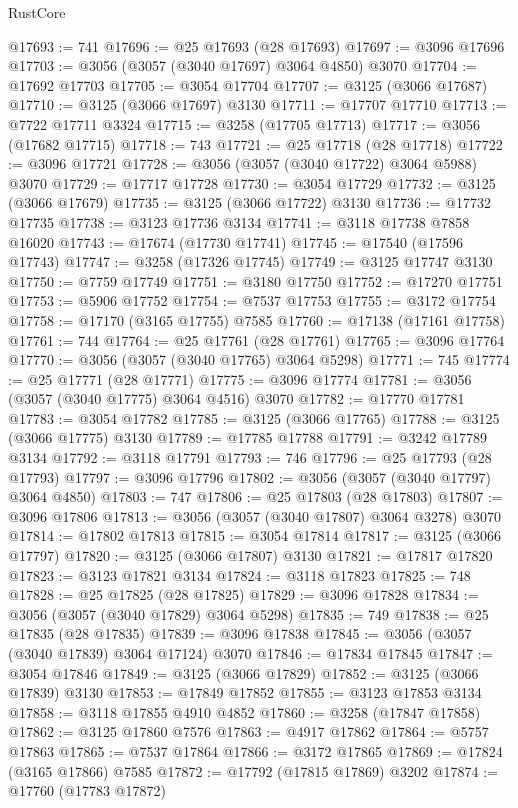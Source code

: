 \begin{lexlean}{RustCore}
\begin{coremodule}
@17693 := 741
@17696 := @25 @17693 (@28 @17693)
@17697 := @3096 @17696
@17703 := @3056 (@3057 (@3040 @17697) @3064 @4850) @3070
@17704 := @17692 @17703
@17705 := @3054 @17704
@17707 := @3125 (@3066 @17687)
@17710 := @3125 (@3066 @17697) @3130
@17711 := @17707 @17710
@17713 := @7722 @17711 @3324
@17715 := @3258 (@17705 @17713)
@17717 := @3056 (@17682 @17715)
@17718 := 743
@17721 := @25 @17718 (@28 @17718)
@17722 := @3096 @17721
@17728 := @3056 (@3057 (@3040 @17722) @3064 @5988) @3070
@17729 := @17717 @17728
@17730 := @3054 @17729
@17732 := @3125 (@3066 @17679)
@17735 := @3125 (@3066 @17722) @3130
@17736 := @17732 @17735
@17738 := @3123 @17736 @3134
@17741 := @3118 @17738 @7858 @16020
@17743 := @17674 (@17730 @17741)
@17745 := @17540 (@17596 @17743)
@17747 := @3258 (@17326 @17745)
@17749 := @3125 @17747 @3130
@17750 := @7759 @17749
@17751 := @3180 @17750
@17752 := @17270 @17751
@17753 := @5906 @17752
@17754 := @7537 @17753
@17755 := @3172 @17754
@17758 := @17170 (@3165 @17755) @7585
@17760 := @17138 (@17161 @17758)
@17761 := 744
@17764 := @25 @17761 (@28 @17761)
@17765 := @3096 @17764
@17770 := @3056 (@3057 (@3040 @17765) @3064 @5298)
@17771 := 745
@17774 := @25 @17771 (@28 @17771)
@17775 := @3096 @17774
@17781 := @3056 (@3057 (@3040 @17775) @3064 @4516) @3070
@17782 := @17770 @17781
@17783 := @3054 @17782
@17785 := @3125 (@3066 @17765)
@17788 := @3125 (@3066 @17775) @3130
@17789 := @17785 @17788
@17791 := @3242 @17789 @3134
@17792 := @3118 @17791
@17793 := 746
@17796 := @25 @17793 (@28 @17793)
@17797 := @3096 @17796
@17802 := @3056 (@3057 (@3040 @17797) @3064 @4850)
@17803 := 747
@17806 := @25 @17803 (@28 @17803)
@17807 := @3096 @17806
@17813 := @3056 (@3057 (@3040 @17807) @3064 @3278) @3070
@17814 := @17802 @17813
@17815 := @3054 @17814
@17817 := @3125 (@3066 @17797)
@17820 := @3125 (@3066 @17807) @3130
@17821 := @17817 @17820
@17823 := @3123 @17821 @3134
@17824 := @3118 @17823
@17825 := 748
@17828 := @25 @17825 (@28 @17825)
@17829 := @3096 @17828
@17834 := @3056 (@3057 (@3040 @17829) @3064 @5298)
@17835 := 749
@17838 := @25 @17835 (@28 @17835)
@17839 := @3096 @17838
@17845 := @3056 (@3057 (@3040 @17839) @3064 @17124) @3070
@17846 := @17834 @17845
@17847 := @3054 @17846
@17849 := @3125 (@3066 @17829)
@17852 := @3125 (@3066 @17839) @3130
@17853 := @17849 @17852
@17855 := @3123 @17853 @3134
@17858 := @3118 @17855 @4910 @4852
@17860 := @3258 (@17847 @17858)
@17862 := @3125 @17860 @7576
@17863 := @4917 @17862
@17864 := @5757 @17863
@17865 := @7537 @17864
@17866 := @3172 @17865
@17869 := @17824 (@3165 @17866) @7585
@17872 := @17792 (@17815 @17869) @3202
@17874 := @17760 (@17783 @17872)

\end{coremodule}
\end{lexlean}
